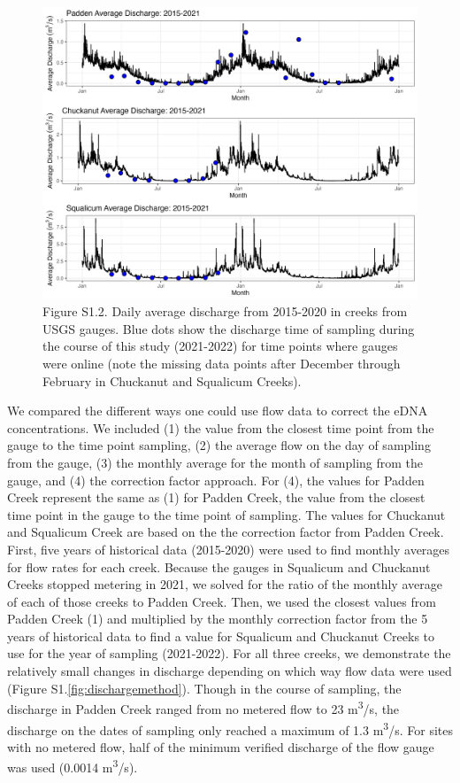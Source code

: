 \documentclass[
]{article}
\begin{document}
\begin{figure}
\centering
\includegraphics{../Output/SupplementalFigures/historical_flow_year_avg_sampling.png}
\caption{Figure S1.2. Daily average discharge from 2015-2020 in creeks
from USGS gauges. Blue dots show the discharge time of sampling during
the course of this study (2021-2022) for time points where gauges were
online (note the missing data points after December through February in
Chuckanut and Squalicum Creeks).\label{fig:dischargesupp}}
\end{figure}

We compared the different ways one could use flow data to correct the
eDNA concentrations. We included (1) the value from the closest time
point from the gauge to the time point sampling, (2) the average flow on
the day of sampling from the gauge, (3) the monthly average for the
month of sampling from the gauge, and (4) the correction factor
approach. For (4), the values for Padden Creek represent the same as (1)
for Padden Creek, the value from the closest time point in the gauge to
the time point of sampling. The values for Chuckanut and Squalicum Creek
are based on the the correction factor from Padden Creek. First, five
years of historical data (2015-2020) were used to find monthly averages
for flow rates for each creek. Because the gauges in Squalicum and
Chuckanut Creeks stopped metering in 2021, we solved for the ratio of
the monthly average of each of those creeks to Padden Creek. Then, we
used the closest values from Padden Creek (1) and multiplied by the
monthly correction factor from the 5 years of historical data to find a
value for Squalicum and Chuckanut Creeks to use for the year of sampling
(2021-2022). For all three creeks, we demonstrate the relatively small
changes in discharge depending on which way flow data were used (Figure
S1.\ref{fig:dischargemethod}). Though in the course of sampling, the
discharge in Padden Creek ranged from no metered flow to 23
m\textsuperscript{3}/s, the discharge on the dates of sampling only
reached a maximum of 1.3 m\textsuperscript{3}/s. For sites with no
metered flow, half of the minimum verified discharge of the flow gauge
was used (0.0014 m\textsuperscript{3}/s).
\end{document}
